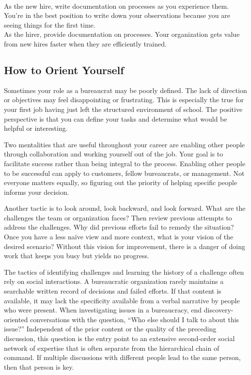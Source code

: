 \ \\
\begin{minipage}{\textwidth}
As the new hire, write documentation on processes as you experience them. You're in the best position to write down your observations because you are seeing things for the first time.\\
As the hirer, provide documentation on processes. Your organization gets value from new hires faster when they are efficiently trained. 
\end{minipage}

\subsection*{How to Orient Yourself}

Sometimes your role as a bureaucrat may be poorly defined. The lack of direction or objectives may feel disappointing or frustrating. This is especially the true for your first job having just left the structured environment of school. The positive perspective is that you can define your tasks and determine what would be helpful or interesting. 

Two mentalities that are useful throughout your career are enabling other people through collaboration and working yourself out of the job. Your goal is to facilitate success rather than being integral to the process. Enabling other people to be successful can apply to customers, fellow bureaucrats, or management. Not everyone matters equally, so figuring out the priority of helping specific people informs your decision. 

Another tactic is to look around, look backward, and look forward. What are the challenges the team or organization faces? Then review previous attempts to address the challenges. Why did previous efforts fail to remedy the situation? Once you have a less na\"ive view and more context, what is your vision of the desired scenario? Without this vision for improvement, there is a danger of doing work that keeps you busy but yields no progress. 

The tactics of identifying challenges and learning the history of a challenge often rely on social interactions. A bureaucratic organization rarely maintains a searchable written record of decisions and failed efforts. If that content is available, it may lack the specificity available from a verbal narrative by people who were present. When investigating issues in a bureaucracy, end discovery-oriented conversations with the question, ``Who else should I talk to about this issue?'' Independent of the prior content or the quality of the preceding discussion, this question is the entry point to an extensive second-order social network of expertise that is often separate from the hierarchical chain of command. If multiple  discussions with different people lead to the same person, then that person is key. 

